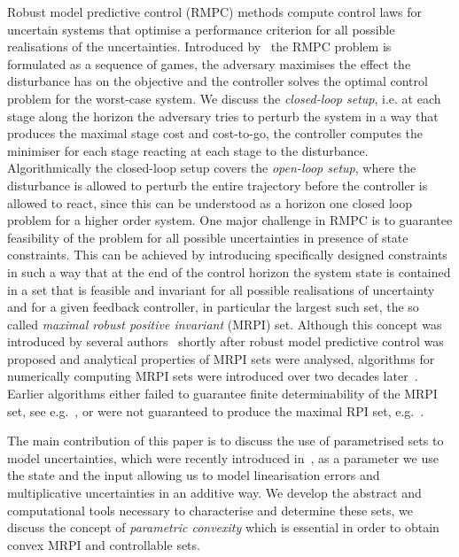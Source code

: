 \documentclass[journal]{IEEEtran}
\theoremstyle{remark}
\theoremstyle{definition}
\begin{document}
Robust model predictive control (RMPC) methods compute control laws for uncertain systems that optimise a 
performance criterion for all possible realisations of the uncertainties.
%
Introduced by~\cite{Witsenhausen:1968} the RMPC problem is formulated as a sequence of games, the
adversary maximises the effect the disturbance has on the objective and the controller solves the optimal
control problem for the worst-case system.
%
We discuss the \emph{closed-loop setup}, i.e. at each stage along the horizon the adversary tries to perturb the system
in a way that produces the maximal stage cost and cost-to-go, the controller computes the minimiser for each stage
reacting at each stage to the disturbance.
%
Algorithmically the closed-loop setup covers the \emph{open-loop setup}, where the disturbance is allowed to perturb the 
entire trajectory before the controller is allowed to react, since this can be understood as a horizon one closed loop
problem for a higher order system.
%
One major challenge in RMPC is to guarantee feasibility of the problem for all possible uncertainties in 
presence of state constraints.
%
This can be achieved by introducing specifically designed constraints in such a way that at the
end of the control horizon the system state is contained in a set that is feasible and invariant for all
possible realisations of uncertainty and for a given feedback controller, in particular the largest such set, 
the so called \emph{maximal robust positive invariant} (MRPI) set.
%
Although this concept was introduced by several authors~\cite{Bertsekas:1971,Glover:1971} shortly after robust 
model predictive control was proposed and analytical properties of MRPI sets were analysed, algorithms for numerically 
computing MRPI sets were introduced over two decades later~\cite{Blanchini:1994,DeSantis:1994,Kolmanovsky:1998}.
%
Earlier algorithms either failed to guarantee finite determinability of the MRPI set, see e.g.~\cite{Blanchini:1990}, 
or were not guaranteed to produce the maximal RPI set, e.g.~\cite{Blanchini:1991}.


The main contribution of this paper is to discuss the use of parametrised sets to model uncertainties, 
which were recently introduced in~\cite{Schaich:CDC:2015,Schaich:NMPC:2015}, as a parameter we use the 
state and the input allowing us to model linearisation errors and multiplicative uncertainties in an 
additive way.
%
We develop the abstract and computational tools necessary to characterise and determine these sets, 
we discuss the concept of \emph{parametric convexity} which is essential in order to obtain convex 
MRPI and controllable sets.
\end{document}
